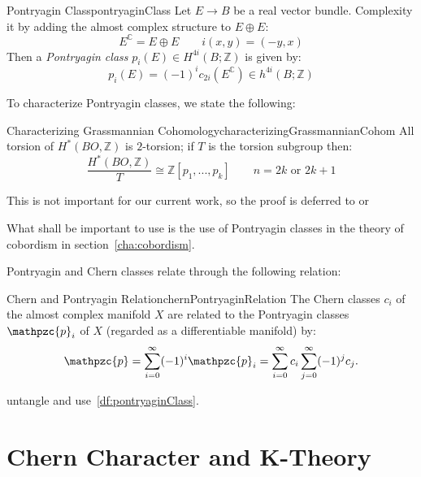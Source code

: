 \documentclass{ut-thesis}
\newenvironment{Proof}[1][]
  {\begin{ProofTcb}[#1]}
  {\end{ProofTcb}}
\newcommand{\Z}{{\mathbb{Z}}}
\newcommand{\C}{{\mathbb{C}}}
\newcommand{\cp}{{\mathpzc{p}}}
\begin{document}
\begin{defn}{Pontryagin Class}{pontryaginClass}
  Let $E \to B$ be a real vector bundle. Complexity it by adding the almost complex structure to $E\oplus E$:
  \[
    E^\C = E\oplus E \qquad i(x,y) = (-y,x)
  \]
  Then a \emph{Pontryagin class} $p_i(E) \in H^{4i}(B; \Z)$ is given by:
  \[
    p_i(E) = (-1)^ic_{2i}(E^\C) \in h^{4i}(B;\Z)
  \]
\end{defn}

To characterize Pontryagin classes, we state the following:

\begin{prop}{Characterizing Grassmannian Cohomology}{characterizingGrassmannianCohom}
    All torsion of $H^*(BO, \Z)$ is $2$-torsion; if $T$ is the torsion subgroup then:
      \[
        \frac{H^*(BO, \Z)}{T} \cong \Z[p_1, ..., p_k] \qquad n = 2k\text{ or } 2k+1
      \]
\end{prop}

\begin{Proof}
  This is not important for our current work, so the proof is deferred to \cite{NateKTheory} or~\cite{hatcherVectorBundlesKTheory2017}
\end{Proof}

What shall be important to use is the use of Pontryagin classes in the theory of cobordism in
section~\ref{cha:cobordism}.

Pontryagin and Chern classes relate through the following relation:

\begin{thm}{Chern and Pontryagin Relation}{chernPontryaginRelation}
  The Chern classes $c_i$ of the almost complex manifold $X$ are related to the Pontryagin
  classes $\cp_i$ of $X$ (regarded as a differentiable manifold) by:
\[
    \cp = \sum_{i=0}^{\infty} (-1)^i \cp_i = \sum_{i=0}^{\infty} c_i \sum_{j=0}^{\infty} (-1)^j c_j.
\]
\end{thm}

\begin{Proof}
  untangle and use~\cref{df:pontryaginClass}.
\end{Proof}



\section{Chern Character and K-Theory}\label{sec:chernCharacter}
\end{document}

